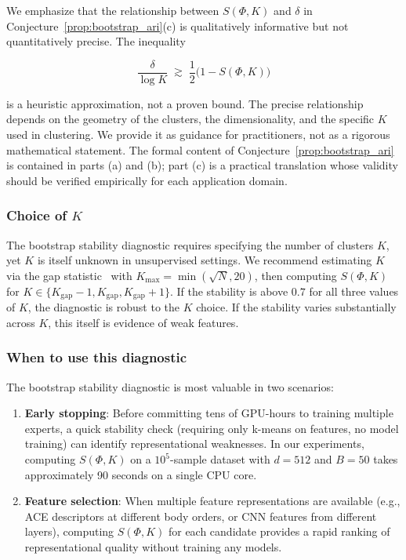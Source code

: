 We emphasize that the relationship between $S(\Phi, K)$ and $\delta$ in Conjecture~\ref{prop:bootstrap_ari}(c) is qualitatively informative but not quantitatively precise. The inequality

\[
\frac{\delta}{\log K} \;\gtrsim\; \frac{1}{2}\bigl(1 - S(\Phi, K)\bigr)
\]

is a heuristic approximation, not a proven bound. The precise relationship depends on the geometry of the clusters, the dimensionality, and the specific $K$ used in clustering. We provide it as guidance for practitioners, not as a rigorous mathematical statement. The formal content of Conjecture~\ref{prop:bootstrap_ari} is contained in parts (a) and (b); part (c) is a practical translation whose validity should be verified empirically for each application domain.

\subsubsection{Choice of $K$}

The bootstrap stability diagnostic requires specifying the number of clusters $K$, yet $K$ is itself unknown in unsupervised settings. We recommend estimating $K$ via the gap statistic~\cite{tibshirani2001gap} with $K_{\max} = \min(\sqrt{N}, 20)$, then computing $S(\Phi, K)$ for $K \in \{K_{\text{gap}} - 1, K_{\text{gap}}, K_{\text{gap}} + 1\}$. If the stability is above $0.7$ for all three values of $K$, the diagnostic is robust to the $K$ choice. If the stability varies substantially across $K$, this itself is evidence of weak features.

\subsubsection{When to use this diagnostic}

The bootstrap stability diagnostic is most valuable in two scenarios:

\begin{enumerate}
    \item \textbf{Early stopping}: Before committing tens of GPU-hours to training multiple experts, a quick stability check (requiring only k-means on features, no model training) can identify representational weaknesses. In our experiments, computing $S(\Phi, K)$ on a $10^5$-sample dataset with $d = 512$ and $B = 50$ takes approximately 90 seconds on a single CPU core.
    \item \textbf{Feature selection}: When multiple feature representations are available (e.g., ACE descriptors at different body orders, or CNN features from different layers), computing $S(\Phi, K)$ for each candidate provides a rapid ranking of representational quality without training any models.
\end{enumerate}

